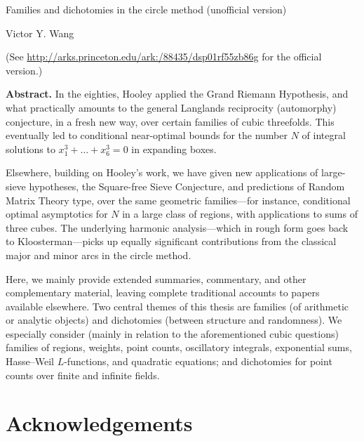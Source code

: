 \documentclass[12pt]{report}
\makeatletter
\renewcommand\tableofcontents{%
    \@starttoc{toc}%
}
\makeatother
\begin{document}
{\centering
\Large Families and dichotomies in the circle method (unofficial version)

\medskip
\normalsize Victor Y. Wang

\medskip
(See \url{http://arks.princeton.edu/ark:/88435/dsp01rf55zb86g} for the official version.)
\par}

\medskip
\noindent\textbf{Abstract.}
In the eighties, Hooley applied the Grand Riemann Hypothesis, and what practically amounts to the general Langlands reciprocity (automorphy) conjecture, in a fresh new way, over certain families of cubic threefolds.
This eventually led to conditional near-optimal bounds for the number $N$ of integral solutions to $x_1^3+\dots+x_6^3 = 0$ in expanding boxes.

Elsewhere, building on Hooley's work, we have given new applications of large-sieve hypotheses, the Square-free Sieve Conjecture, and predictions of Random Matrix Theory type, over the same geometric families---for instance, conditional optimal asymptotics for $N$ in a large class of regions, with applications to sums of three cubes.
The underlying harmonic analysis---which in rough form goes back to Kloosterman---picks up equally significant contributions from the classical major and minor arcs in the circle method.

Here, we mainly provide extended summaries, commentary, and other complementary material, leaving complete traditional accounts to papers available elsewhere.
Two central themes of this thesis are families (of arithmetic or analytic objects) and dichotomies (between structure and randomness).
We especially consider (mainly in relation to the aforementioned cubic questions) families of regions, weights, point counts, oscillatory integrals, exponential sums, Hasse--Weil $L$-functions, and quadratic equations; and dichotomies for point counts over finite and infinite fields.

\bigskip
{}
\medskip

\setcounter{tocdepth}{1}
\tableofcontents
\setcounter{tocdepth}{3}

\section*{Acknowledgements}
\end{document}
